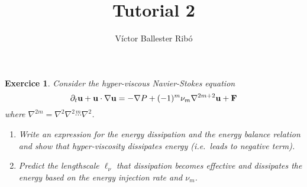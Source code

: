 \documentclass[10pt,a4paper]{article}
\title{\bfseries\Large Tutorial 2}
\author{Víctor Ballester Ribó}
\date{\parbox{\linewidth}{\centering
  Turbulence\endgraf
  M2 Applied and Theoretical Mathematics\endgraf
  Université Paris-Dauphine\endgraf
  Februrary 2024\endgraf}}
\newtheorem{exercici}{Exercice}
\theoremstyle{definition}
\theoremstyle{remark}
\begin{document}
\maketitle
\begin{exercici}\label{ex:1}
  Consider the hyper-viscous Navier-Stokes equation
  \begin{equation}
    \partial_t \boldsymbol{\mathrm{u}} + \boldsymbol{\mathrm{u}} \cdot \nabla \boldsymbol{\mathrm{u}} = -\nabla P + (-1)^m \nu_m \nabla^{2m+2} \boldsymbol{\mathrm{u}} + \boldsymbol{\mathrm{F}}
  \end{equation}
  where $\nabla^{2m} = \nabla^2 \nabla^2 \overset{m}{\cdots} \nabla^2$.
  \begin{enumerate}
    \item Write an expression for the energy dissipation and the energy balance relation and show that hyper-viscosity dissipates energy (i.e.\ leads to negative term).
    \item Predict the lengthscale $\ell_\nu$ that dissipation becomes effective and dissipates the energy based on the energy injection rate and $\nu_m$.
  \end{enumerate}
\end{exercici}
\end{document}
